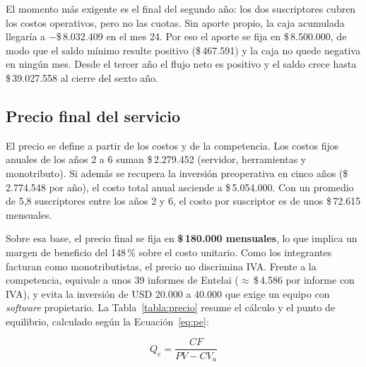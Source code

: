         El momento más exigente es el final del segundo año: los dos suscriptores cubren los costos operativos, pero no las cuotas. Sin aporte propio, la caja acumulada llegaría a $-$\$\,8.032.409 en el mes 24. Por eso el aporte se fija en \$\,8.500.000, de modo que el saldo mínimo resulte positivo (\$\,467.591) y la caja no quede negativa en ningún mes. Desde el tercer año el flujo neto es positivo y el saldo crece hasta \$\,39.027.558 al cierre del sexto año.
        

    \subsection{Precio final del servicio}

        El precio se define a partir de los costos y de la competencia. Los costos fijos anuales de los años 2 a 6 suman \$\,2.279.452 (servidor, herramientas y monotributo). Si además se recupera la inversión preoperativa en cinco años (\$\,2.774.548 por año), el costo total anual asciende a \$\,5.054.000. Con un promedio de 5,8 suscriptores entre los años 2 y 6, el costo por suscriptor es de unos \$\,72.615 mensuales.

        Sobre esa base, el precio final se fija en \textbf{\$\,180.000 mensuales}, lo que implica un margen de beneficio del 148\,\% sobre el costo unitario. Como los integrantes facturan como monotributistas, el precio no discrimina IVA. Frente a la competencia, equivale a unos 39 informes de Entelai ($\approx$\,\$\,4.586 por informe con IVA), y evita la inversión de USD 20.000 a 40.000 que exige un equipo con \textit{software} propietario. La Tabla~\ref{tabla:precio} resume el cálculo y el punto de equilibrio, calculado según la Ecuación~\ref{eq:pe}:

        \begin{equation}
            Q_e = \frac{CF}{PV - CV_u}
            \label{eq:pe}
        \end{equation}

